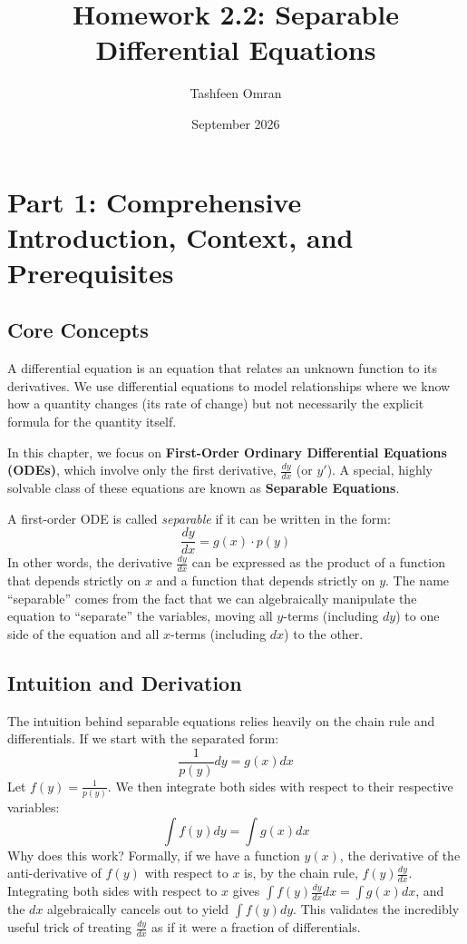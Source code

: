 \documentclass[11pt]{article}
\title{Homework 2.2: Separable Differential Equations}
\author{Tashfeen Omran}
\date{September 2026}
\begin{document}
\maketitle
\tableofcontents
\newpage

\section{Part 1: Comprehensive Introduction, Context, and Prerequisites}

\subsection{Core Concepts}
A differential equation is an equation that relates an unknown function to its derivatives. We use differential equations to model relationships where we know how a quantity changes (its rate of change) but not necessarily the explicit formula for the quantity itself. 

In this chapter, we focus on \textbf{First-Order Ordinary Differential Equations (ODEs)}, which involve only the first derivative, $\frac{dy}{dx}$ (or $y'$). A special, highly solvable class of these equations are known as \textbf{Separable Equations}. 

A first-order ODE is called \textit{separable} if it can be written in the form:
\[ \frac{dy}{dx} = g(x) \cdot p(y) \]
In other words, the derivative $\frac{dy}{dx}$ can be expressed as the product of a function that depends strictly on $x$ and a function that depends strictly on $y$. The name ``separable'' comes from the fact that we can algebraically manipulate the equation to ``separate'' the variables, moving all $y$-terms (including $dy$) to one side of the equation and all $x$-terms (including $dx$) to the other.

\subsection{Intuition and Derivation}
The intuition behind separable equations relies heavily on the chain rule and differentials. If we start with the separated form:
\[ \frac{1}{p(y)} dy = g(x) dx \]
Let $f(y) = \frac{1}{p(y)}$. We then integrate both sides with respect to their respective variables:
\[ \int f(y) dy = \int g(x) dx \]
Why does this work? Formally, if we have a function $y(x)$, the derivative of the anti-derivative of $f(y)$ with respect to $x$ is, by the chain rule, $f(y) \frac{dy}{dx}$. Integrating both sides with respect to $x$ gives $\int f(y) \frac{dy}{dx} dx = \int g(x) dx$, and the $dx$ algebraically cancels out to yield $\int f(y) dy$. This validates the incredibly useful trick of treating $\frac{dy}{dx}$ as if it were a fraction of differentials.
\end{document}
